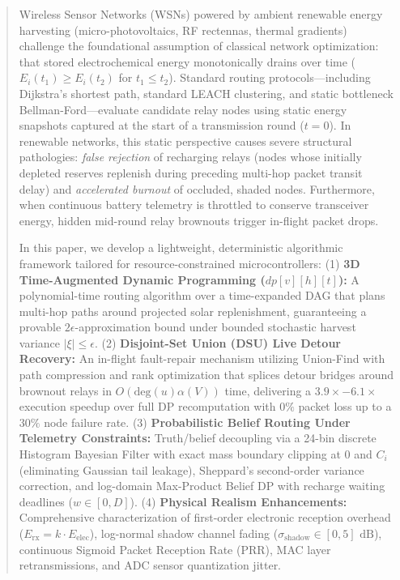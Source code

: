 \documentclass[journal]{IEEEtran}
\begin{document}
\begin{abstract}
Wireless Sensor Networks (WSNs) powered by ambient renewable energy harvesting (micro-photovoltaics, RF rectennas, thermal gradients) challenge the foundational assumption of classical network optimization: that stored electrochemical energy monotonically drains over time ($E_i(t_1) \ge E_i(t_2)$ for $t_1 \le t_2$). Standard routing protocols---including Dijkstra's shortest path, standard LEACH clustering, and static bottleneck Bellman-Ford---evaluate candidate relay nodes using static energy snapshots captured at the start of a transmission round ($t=0$). In renewable networks, this static perspective causes severe structural pathologies: \textit{false rejection} of recharging relays (nodes whose initially depleted reserves replenish during preceding multi-hop packet transit delay) and \textit{accelerated burnout} of occluded, shaded nodes. Furthermore, when continuous battery telemetry is throttled to conserve transceiver energy, hidden mid-round relay brownouts trigger in-flight packet drops.

In this paper, we develop a lightweight, deterministic algorithmic framework tailored for resource-constrained microcontrollers:
(1) \textbf{3D Time-Augmented Dynamic Programming ($dp[v][h][t]$):} A polynomial-time routing algorithm over a time-expanded DAG that plans multi-hop paths around projected solar replenishment, guaranteeing a provable $2\epsilon$-approximation bound under bounded stochastic harvest variance $|\xi| \le \epsilon$.
(2) \textbf{Disjoint-Set Union (DSU) Live Detour Recovery:} An in-flight fault-repair mechanism utilizing Union-Find with path compression and rank optimization that splices detour bridges around brownout relays in $O(\text{deg}(u)\alpha(V))$ time, delivering a $3.9\times - 6.1\times$ execution speedup over full DP recomputation with $0\%$ packet loss up to a $30\%$ node failure rate.
(3) \textbf{Probabilistic Belief Routing Under Telemetry Constraints:} Truth/belief decoupling via a 24-bin discrete Histogram Bayesian Filter with exact mass boundary clipping at 0 and $C_i$ (eliminating Gaussian tail leakage), Sheppard's second-order variance correction, and log-domain Max-Product Belief DP with recharge waiting deadlines ($w \in [0, D]$).
(4) \textbf{Physical Realism Enhancements:} Comprehensive characterization of first-order electronic reception overhead ($E_{\text{rx}} = k \cdot E_{\text{elec}}$), log-normal shadow channel fading ($\sigma_{\text{shadow}} \in [0, 5]\text{ dB}$), continuous Sigmoid Packet Reception Rate (PRR), MAC layer retransmissions, and ADC sensor quantization jitter.


\end{abstract}
\end{document}
